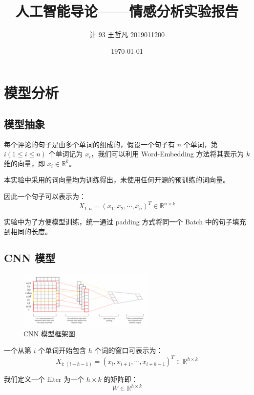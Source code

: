 \documentclass[a4paper]{article}
\title{人工智能导论------情感分析实验报告}
\author{计 93 王哲凡 2019011200}
\date{\today}
\newenvironment{lightgrayleftbar}{%
  \def\FrameCommand{\textcolor{lightgray}{\vrule width 3pt} \hspace{3pt}}%
  \MakeFramed {\advance\hsize-\width \FrameRestore}}%
{\endMakeFramed}
\begin{document}
    \maketitle
    \tableofcontents

    \newpage
    \section{模型分析}

    \subsection{模型抽象}
    每个评论的句子是由多个单词的组成的，假设一个句子有 $n$ 个单词，第 $i(1 \le i \le n)$ 个单词记为 $x_i$，我们可以利用 Word-Embedding 方法将其表示为 $k$ 维的向量，即 $x_i \in \mathbb{R}^k$。

    \begin{lightgrayleftbar}
        本实验中采用的词向量均为训练得出，未使用任何开源的预训练的词向量。
    \end{lightgrayleftbar}

    因此一个句子可以表示为：
    $$
    X_{1: n} = (x_1, x_2, \cdots, x_n)^T \in \mathbb{R}^{n \times k}
    $$

    实验中为了方便模型训练，统一通过 padding 方式将同一个 Batch 中的句子填充到相同的长度。

    \subsection{CNN 模型}

    \begin{figure}[h]
        \centering
        \includegraphics[width=0.6\textwidth]{1}
        \caption{CNN 模型框架图}
        \label{fig1}
    \end{figure}

    一个从第 $i$ 个单词开始包含 $h$ 个词的窗口可表示为：
    $$
    X_{i: (i + h - 1)} = (x_i, x_{i + 1}, \cdots, x_{i + h - 1})^T \in \mathbb{R}^{h \times k}
    $$

    我们定义一个 filter 为一个 $h \times k$ 的矩阵即：
    $$
    W \in \mathbb{R}^{h \times k}
    $$
\end{document}
